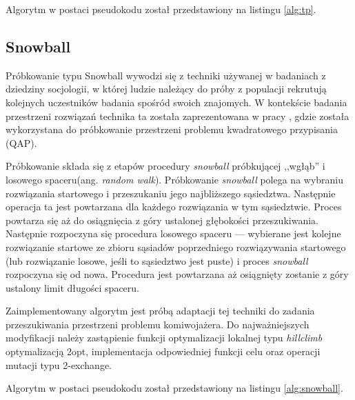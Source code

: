 Algorytm w postaci pseudokodu został przedstawiony na listingu \ref{alg:tp}.

\subsection{Snowball} \label{section:snowball}
Próbkowanie typu Snowball wywodzi się z techniki używanej w badaniach z dziedziny socjologii, w której ludzie należący do próby z populacji
rekrutują kolejnych uczestników badania spośród swoich znajomych.
W kontekście badania przestrzeni rozwiązań technika ta została zaprezentowana w pracy \cite{DBLP:conf/ppsn/VerelDOT18}, gdzie została wykorzystana
do próbkowanie przestrzeni problemu kwadratowego przypisania (QAP).

Próbkowanie składa się z etapów procedury \textit{snowball} próbkującej ,,wgłąb'' i losowego spaceru(ang. \textit{random walk}).
Próbkowanie \textit{snowball} polega na wybraniu rozwiązania startowego i przeszukaniu jego najbliższego sąsiedztwa.
Następnie operacja ta jest powtarzana dla każdego rozwiązania w tym sąsiedztwie. Proces powtarza się aż do osiągnięcia z góry ustalonej głębokości
przeszukiwania. Następnie rozpoczyna się procedura losowego spaceru --- wybierane jest kolejne rozwiązanie startowe
ze zbioru sąsiadów poprzedniego rozwiązywania startowego (lub rozwiązanie losowe, jeśli to sąsiedztwo jest puste) i proces \textit{snowball}
rozpoczyna się od nowa. Procedura jest powtarzana aż osiągnięty zostanie z góry ustalony limit długości spaceru.

Zaimplementowany algorytm jest próbą adaptacji tej techniki do zadania przeszukiwania przestrzeni
problemu komiwojażera. Do najważniejszych modyfikacji należy zastąpienie funkcji optymalizacji lokalnej typu \textit{hillclimb}
optymalizacją 2opt, implementacja odpowiedniej funkcji celu oraz operacji mutacji typu 2-exchange.

Algorytm w postaci pseudokodu został przedstawiony na listingu \ref{alg:snowball}.

\newpage

